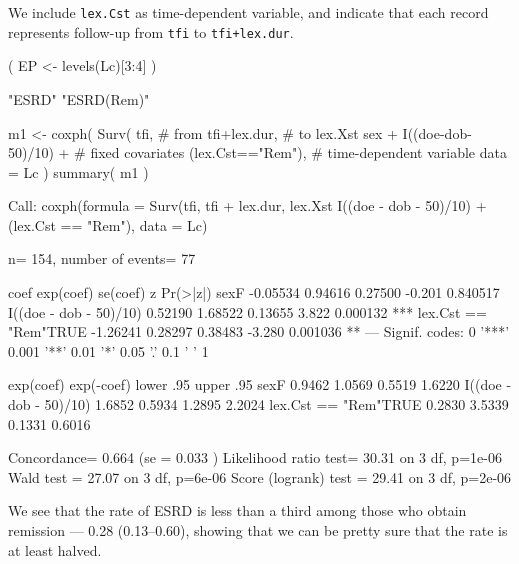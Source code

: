 \begin{enumerate}
  We include \texttt{lex.Cst} as time-dependent variable, and
  indicate that each record represents follow-up from \texttt{tfi}
  to \texttt{tfi+lex.dur}.
\begin{Schunk}
\begin{Sinput}
 ( EP <- levels(Lc)[3:4] )
\end{Sinput}
\begin{Soutput}
[1] "ESRD"      "ESRD(Rem)"
\end{Soutput}
\begin{Sinput}
 m1 <- coxph( Surv( tfi,                  # from
                    tfi+lex.dur,          # to
                    lex.Xst %in% EP ) ~   # event
              sex + I((doe-dob-50)/10) +  # fixed covariates
              (lex.Cst=="Rem"),           # time-dependent variable
              data = Lc )
 summary( m1 )
\end{Sinput}
\begin{Soutput}
Call:
coxph(formula = Surv(tfi, tfi + lex.dur, lex.Xst %in% EP) ~ sex + 
    I((doe - dob - 50)/10) + (lex.Cst == "Rem"), data = Lc)

  n= 154, number of events= 77 

                           coef exp(coef) se(coef)      z Pr(>|z|)    
sexF                   -0.05534   0.94616  0.27500 -0.201 0.840517    
I((doe - dob - 50)/10)  0.52190   1.68522  0.13655  3.822 0.000132 ***
lex.Cst == "Rem"TRUE   -1.26241   0.28297  0.38483 -3.280 0.001036 ** 
---
Signif. codes:  0 '***' 0.001 '**' 0.01 '*' 0.05 '.' 0.1 ' ' 1

                       exp(coef) exp(-coef) lower .95 upper .95
sexF                      0.9462     1.0569    0.5519    1.6220
I((doe - dob - 50)/10)    1.6852     0.5934    1.2895    2.2024
lex.Cst == "Rem"TRUE      0.2830     3.5339    0.1331    0.6016

Concordance= 0.664  (se = 0.033 )
Likelihood ratio test= 30.31  on 3 df,   p=1e-06
Wald test            = 27.07  on 3 df,   p=6e-06
Score (logrank) test = 29.41  on 3 df,   p=2e-06
\end{Soutput}
\end{Schunk}
  We see that the rate of ESRD is less than a third among those
  who obtain remission --- 0.28 (0.13--0.60), showing that we can be
  pretty sure that the rate is at least halved.

\end{enumerate}

